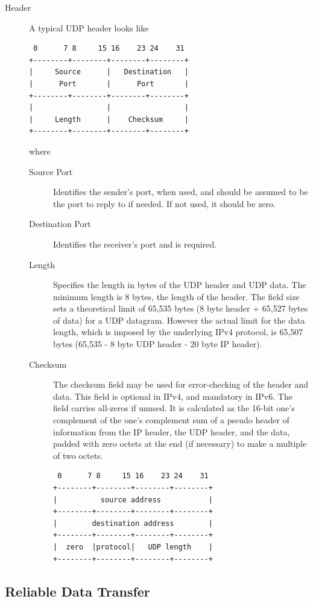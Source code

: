\documentclass{article}
\begin{document}
\begin{description}
    \item[Header] A typical UDP header looks like 
    \begin{lstlisting}
 0      7 8     15 16    23 24    31
+--------+--------+--------+--------+
|     Source      |   Destination   |
|      Port       |      Port       |
+--------+--------+--------+--------+
|                 |                 |
|     Length      |    Checksum     |
+--------+--------+--------+--------+
    \end{lstlisting}
    where 
    \begin{description}
        \item[Source Port] Identifies the sender's port, when used, and should be assumed to be the port
        to reply to if needed. If not used, it should be zero.
        \item[Destination Port] Identifies the receiver's port and is required.
        \item[Length] Specifies the length in bytes of the UDP header and UDP data. The minimum length
        is 8 bytes, the length of the header. The field size sets a theoretical limit of 65,535 bytes
        (8 byte header + 65,527 bytes of data) for a UDP datagram. However the actual limit for the 
        data length, which is imposed by the underlying IPv4 protocol, is 65,507 bytes 
        (65,535 - 8 byte UDP header - 20 byte IP header).
        \item[Checksum] The checksum field may be used for error-checking of the header and data.
        This field is optional in IPv4, and mandatory in IPv6. The field carries all-zeros if unused.
        It is calculated as the 16-bit one's complement of the one's complement sum of a pseudo header
        of information from the IP header, the UDP header, and the data, padded with zero octets at the
        end (if necessary) to make a multiple of two octets.
        \begin{lstlisting}
 0      7 8     15 16    23 24    31
+--------+--------+--------+--------+
|          source address           |
+--------+--------+--------+--------+
|        destination address        |
+--------+--------+--------+--------+
|  zero  |protocol|   UDP length    |
+--------+--------+--------+--------+
        \end{lstlisting}
    \end{description}
\end{description}

\subsection*{Reliable Data Transfer}
\end{document}

